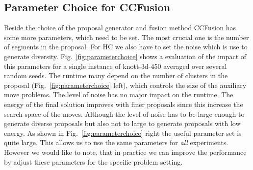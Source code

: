\documentclass[10pt,twocolumn,letterpaper]{article}
\theoremstyle{definition}
\begin{document}
\subsection{Parameter Choice for CCFusion}
Beside the choice of the proposal generator and fusion method CCFusion has some more parameters, which need to be set.
The most crucial one is the number of segments in the proposal. For HC we also have to set the noise which is use to generate diversity.
Fig.~\ref{fig:parameterchoice} shows a evaluation of the impact of this parameters for a single instance of knott-3d-450 averaged over several random seeds.
The runtime many depend on the number of clusters in the proposal (Fig.~\ref{fig:parameterchoice} left), which controls the size of the auxiliary move problems.
The level of noise has no major impact on the runtime.
The energy of the final solution improves with finer proposals since this increase the search-space of the moves.
Although the level of noise has to be large enough to generate diverse proposals but also not to large to generate proposals with low energy.
As shown in Fig.~\ref{fig:parameterchoice} right the useful parameter set is quite large. This allows us to use the same parameters for \emph{all}
experiments. However we would like to note, that in practice we can improve the performance by adjust these parameters for the specific problem setting.
%
%
\end{document}
